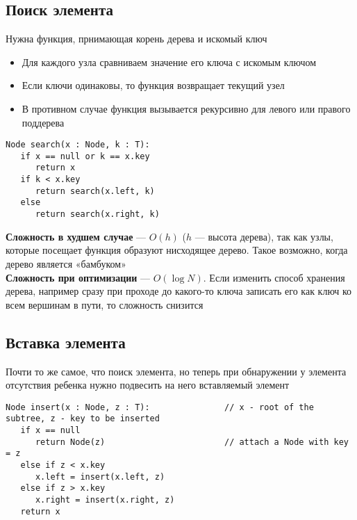 \documentclass[a4paper]{article}
\begin{document}
\subsection{Поиск элемента}
Нужна функция, прнимающая корень дерева и искомый ключ
\begin{itemize}
    \item Для каждого узла сравниваем значение его ключа с искомым ключом
    \item Если ключи одинаковы, то функция возвращает текущий узел
    \item В противном случае функция вызывается рекурсивно для левого или правого поддерева
\end{itemize}
\begin{lstlisting}
Node search(x : Node, k : T):
   if x == null or k == x.key
      return x
   if k < x.key
      return search(x.left, k)
   else
      return search(x.right, k)
\end{lstlisting}
\textbf{Сложность в худшем случае} — $O(h)$ ($h$ — высота дерева), так как узлы, которые посещает функция образуют нисходящее дерево. Такое возможно, когда дерево является «бамбуком»\\[2mm]
\textbf{Сложность при оптимизации} — $O(\log N)$. Если изменить способ хранения дерева, например сразу при проходе до какого-то ключа записать его как ключ ко всем вершинам в пути, то сложность снизится

\subsection{Вставка элемента}
Почти то же самое, что поиск элемента, но теперь при обнаружении у элемента отсутствия ребенка нужно подвесить на него вставляемый элемент
\begin{lstlisting}
Node insert(x : Node, z : T):               // x - root of the subtree, z - key to be inserted
   if x == null 
      return Node(z)                        // attach a Node with key = z
   else if z < x.key
      x.left = insert(x.left, z)
   else if z > x.key
      x.right = insert(x.right, z)
   return x
\end{lstlisting}
\end{document}
